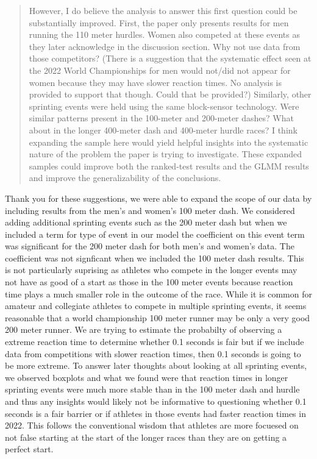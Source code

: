 \documentclass[12pt]{article}
\newenvironment{comment}%
{\begin{quotation}\noindent\small\it\color{darkblue}\ignorespaces%
}{\end{quotation}}
\begin{document}
\begin{comment}
However, I do believe the analysis to answer this first question could be
substantially improved. First, the paper only presents results for men running
the 110 meter hurdles. Women also competed at these events as they later
acknowledge in the discussion section. Why not use data from those competitors?
(There is a suggestion that the systematic effect seen at the 2022 World
Championships for men would not/did not appear for women because they may have
slower reaction times. No analysis is provided to support that though. Could
that be provided?) Similarly, other sprinting events were held using the same
block-sensor technology. Were similar patterns present in the 100-meter and
200-meter dashes? What about in the longer 400-meter dash and 400-meter hurdle
races? I think expanding the sample here would yield helpful insights into the
systematic nature of the problem the paper is trying to investigate. These
expanded samples could improve both the ranked-test results and the GLMM results
and improve the generalizability of the conclusions.
\end{comment}


Thank you for these suggestions, we were able to expand the scope of our data
by including results from the men's and women's 100 meter dash.  We considered
adding additional sprinting events such as the 200 meter dash but
when we included a term for type of event in our model the coefficient on this
event term was significant for the 200 meter dash for both men's and women's
data. The coefficient was not signficant when we included the 100 meter dash
results. This is not particularly suprising as athletes who compete in the longer
events may not have as good of a start as those in the 100
meter events because reaction time plays a much smaller role in the outcome of
the race. While it is common for amateur and collegiate athletes to compete in
multiple sprinting events, it seems reasonable that a world championship 100
meter runner may be only a very good 200 meter runner.  We are trying to
estimate the probabilty of observing a extreme reaction time to determine
whether 0.1 seconds is fair but if we include data from competitions with slower
reaction times, then 0.1 seconds is going to be more extreme.  To answer later
thoughts about looking at all sprinting events, we observed boxplots and what we
found were that reaction times in longer sprinting events were much more stable
than in the 100 meter dash and hurdle and thus any insights would likely not be
informative to questioning whether 0.1 seconds is a fair barrier or if athletes
in those events had faster reaction times in 2022.  This follows the conventional
wisdom that athletes are more focuesed on not false starting at the start of the
longer races than they are on getting a perfect start.
\end{document}
